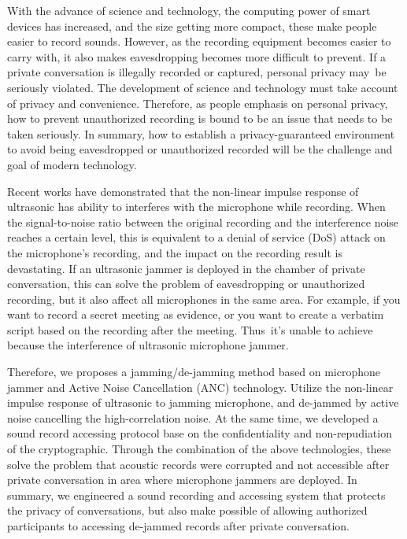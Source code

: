 \begin{abstract*}

    With the advance of science and technology,
the computing power of smart devices has increased,
and the size getting more compact,
these make people easier to record sounds.
However, as the recording equipment becomes easier to carry with,
it also makes eavesdropping becomes more difficult to prevent.
If a private conversation is illegally recorded or captured,
personal privacy may be seriously violated.
The development of science and technology must take account of privacy and convenience.
Therefore, as people emphasis on personal privacy,
how to prevent unauthorized recording is bound to be an issue that needs to be taken seriously.
In summary, how to establish a privacy-guaranteed environment
to avoid being eavesdropped or unauthorized recorded
will be the challenge and goal of modern technology.

    Recent works have demonstrated that the non-linear impulse response of ultrasonic
has ability to interferes with the microphone while recording.
When the signal-to-noise ratio between the original recording
and the interference noise reaches a certain level,
this is equivalent to a denial of service (DoS) attack on the microphone's recording,
and the impact on the recording result is devastating.
If an ultrasonic jammer is deployed in the chamber of private conversation,
this can solve the problem of eavesdropping or unauthorized recording,
but it also affect all microphones in the same area. For example,
if you want to record a secret meeting as evidence,
or you want to create a verbatim script based on the recording after the meeting.
Thus it's unable to achieve because the interference of ultrasonic microphone jammer.

    Therefore, we proposes a jamming/de-jamming method
based on microphone jammer and Active Noise Cancellation (ANC) technology.
Utilize the non-linear impulse response of ultrasonic to jamming microphone,
and de-jammed by active noise cancelling the high-correlation noise.
At the same time, we developed a sound record accessing protocol
base on the confidentiality and non-repudiation of the cryptographic.
Through the combination of the above technologies,
these solve the problem that acoustic records were corrupted and not accessible
after private conversation in area where microphone jammers are deployed.
In summary, we engineered a sound recording and accessing system
that protects the privacy of conversations,
but also make possible of allowing authorized participants
to accessing de-jammed records after private conversation.

\end{abstract*}